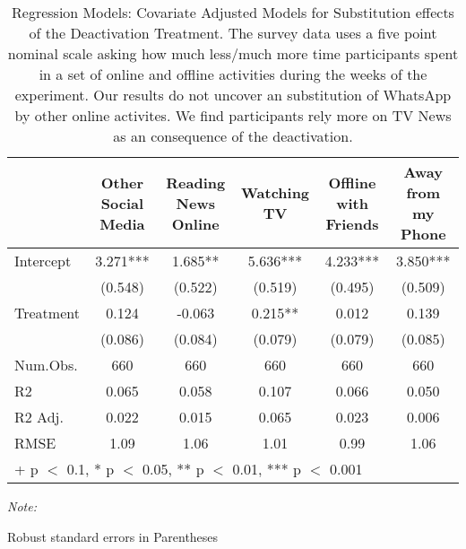 \begin{table}

\caption{Regression Models: Covariate Adjusted Models for Substitution effects of the Deactivation Treatment. The survey data uses a five point nominal scale asking how much less/much more time participants spent in a set of online and offline activities during the weeks of the experiment. Our results do not uncover an substitution of WhatsApp by other online activites. We find participants rely more on TV News as an consequence of the deactivation.}
\centering
\begin{threeparttable}
\begin{tabular}[t]{lccccc}
\toprule
  & Other Social Media & Reading News Online & Watching TV & Offline with Friends & Away from my Phone\\
\midrule
Intercept & 3.271*** & 1.685** & 5.636*** & 4.233*** & 3.850***\\
 & (0.548) & (0.522) & (0.519) & (0.495) & (0.509)\\
Treatment & 0.124 & -0.063 & 0.215** & 0.012 & 0.139\\
 & (0.086) & (0.084) & (0.079) & (0.079) & (0.085)\\
\midrule
Num.Obs. & 660 & 660 & 660 & 660 & 660\\
R2 & 0.065 & 0.058 & 0.107 & 0.066 & 0.050\\
R2 Adj. & 0.022 & 0.015 & 0.065 & 0.023 & 0.006\\
RMSE & 1.09 & 1.06 & 1.01 & 0.99 & 1.06\\
\bottomrule
\multicolumn{6}{l}{\rule{0pt}{1em}+ p $<$ 0.1, * p $<$ 0.05, ** p $<$ 0.01, *** p $<$ 0.001}\\
\end{tabular}
\begin{tablenotes}
\item \textit{Note: } 
\item Robust standard errors in Parentheses
\end{tablenotes}
\end{threeparttable}
\end{table}
